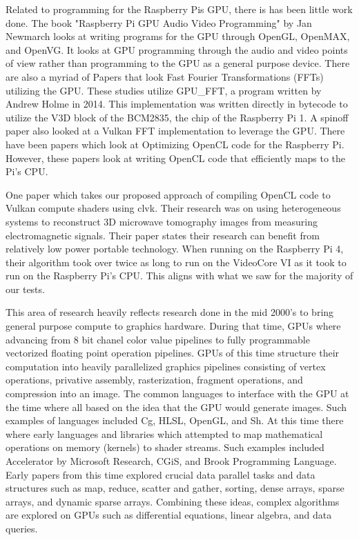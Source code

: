 \documentclass[conference]{IEEEtran}
\begin{document}
 Related to programming for the Raspberry Pis GPU, there is has been little work done. 
 The book "Raspberry Pi GPU Audio Video Programming" by Jan Newmarch looks at writing 
 programs for the GPU through OpenGL, OpenMAX, and OpenVG\cite{newmarch2017raspberry}. It looks at GPU programming 
 through the audio and video points of view rather than programming to the GPU as 
 a general purpose device. There are also a myriad of Papers that look Fast Fourier Transformations 
 (FFTs) utilizing the GPU. These studies utilize GPU\_FFT, a program written by Andrew Holme in 2014\cite{holme_gpu_fft}.
 This implementation was written directly in bytecode to utilize the V3D block of the BCM2835, the chip 
 of the Raspberry Pi 1. A spinoff paper also looked at a Vulkan FFT implementation to leverage the GPU\cite{he_comparing_2018}. 
 There have been papers which look at Optimizing OpenCL code for the Raspberry Pi. However, these papers
 look at writing OpenCL code that efficiently maps to the Pi's CPU.

 One paper which takes our proposed approach of compiling OpenCL code to Vulkan compute shaders using clvk\cite{vasileiou_accelerated_nodate}.
 Their research was on using heterogeneous systems to reconstruct 3D microwave tomography images from measuring 
 electromagnetic signals. Their paper states their research can benefit from relatively low power portable technology. 
 When running on the Raspberry Pi 4, their algorithm took over twice as long to run on the VideoCore VI as it took 
 to run on the Raspberry Pi's CPU. This aligns with what we saw for the majority of our tests.

 This area of research heavily reflects research done in the mid 2000's to bring general purpose compute to 
 graphics hardware. During that time, GPUs where advancing from 8 bit chanel color value pipelines to 
 fully programmable vectorized floating point operation pipelines\cite{owens_survey_2007}. GPUs of this time 
 structure their computation into heavily parallelized graphics pipelines consisting of vertex operations, 
 privative assembly, rasterization, fragment operations, and compression into an image. The common languages to 
 interface with the GPU at the time where all based on the idea that the GPU would generate images. Such examples 
 of languages included Cg, HLSL, OpenGL, and Sh. At this time there where early languages and libraries which attempted 
 to map mathematical operations on memory (kernels) to shader streams.  Such examples included Accelerator by Microsoft 
 Research, CGiS, and Brook Programming Language. Early papers from this time explored crucial data parallel 
 tasks and data structures such as map, reduce, scatter and gather, sorting, dense arrays, sparse arrays, 
 and dynamic sparse arrays. Combining these ideas, complex algorithms are explored on GPUs such as differential 
 equations, linear algebra, and data queries. 
 
\end{document}
